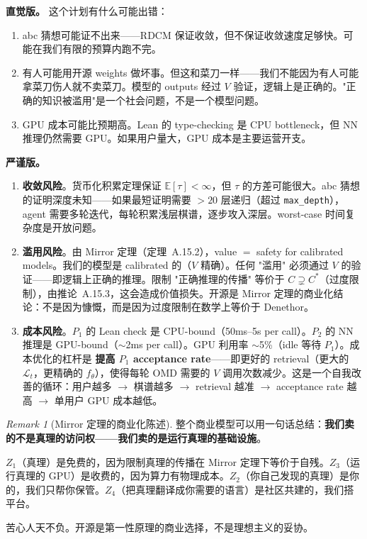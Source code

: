 \documentclass[11pt,a4paper]{article}
\theoremstyle{definition}
\theoremstyle{remark}
\newtheorem{remark}[theorem]{Remark}
\begin{document}
\textbf{直觉版。}
这个计划有什么可能出错：
\begin{enumerate}[nosep]
  \item abc 猜想可能证不出来——RDCM 保证收敛，但不保证收敛速度足够快。可能在我们有限的预算内跑不完。
  \item 有人可能用开源 weights 做坏事。但这和菜刀一样——我们不能因为有人可能拿菜刀伤人就不卖菜刀。模型的 outputs 经过 $V$ 验证，逻辑上是正确的。"正确的知识被滥用"是一个社会问题，不是一个模型问题。
  \item GPU 成本可能比预期高。Lean 的 type-checking 是 CPU bottleneck，但 NN 推理仍然需要 GPU。如果用户量大，GPU 成本是主要运营开支。
\end{enumerate}

\textbf{严谨版。}
\begin{enumerate}[nosep]
  \item \textbf{收敛风险}。货币化积累定理保证 $\mathbb{E}[\tau] < \infty$，但 $\tau$ 的方差可能很大。abc 猜想的证明深度未知——如果最短证明需要 $>20$ 层递归（超过 \texttt{max\_depth}），agent 需要多轮迭代，每轮积累浅层棋谱，逐步攻入深层。worst-case 时间复杂度是开放问题。

  \item \textbf{滥用风险}。由 Mirror 定理（定理~A.15.2），value $=$ safety for calibrated models。我们的模型是 calibrated 的（$V$ 精确）。任何 "滥用" 必须通过 $V$ 的验证——即逻辑上正确的推理。限制 "正确推理的传播" 等价于 $C \supsetneq C^*$（过度限制），由推论~A.15.3，这会造成价值损失。开源是 Mirror 定理的商业化结论：不是因为慷慨，而是因为过度限制在数学上等价于 Denethor。

  \item \textbf{成本风险}。$P_1$ 的 Lean check 是 CPU-bound（50ms--5s per call）。$P_2$ 的 NN 推理是 GPU-bound（$\sim$2ms per call）。GPU 利用率 $\sim$5\%（idle 等待 $P_1$）。成本优化的杠杆是 \textbf{提高 $P_1$ acceptance rate}——即更好的 retrieval（更大的 $\mathcal{L}_t$，更精确的 $f_\theta$），使得每轮 OMD 需要的 $V$ 调用次数减少。这是一个自我改善的循环：用户越多 $\to$ 棋谱越多 $\to$ retrieval 越准 $\to$ acceptance rate 越高 $\to$ 单用户 GPU 成本越低。
\end{enumerate}

\begin{remark}[Mirror 定理的商业化陈述]
整个商业模型可以用一句话总结：\textbf{我们卖的不是真理的访问权——我们卖的是运行真理的基础设施}。

$Z_1$（真理）是免费的，因为限制真理的传播在 Mirror 定理下等价于自残。$Z_3$（运行真理的 GPU）是收费的，因为算力有物理成本。$Z_2$（你自己发现的真理）是你的，我们只帮你保管。$Z_4$（把真理翻译成你需要的语言）是社区共建的，我们搭平台。

苦心人天不负。开源是第一性原理的商业选择，不是理想主义的妥协。
\end{remark}
\end{document}
